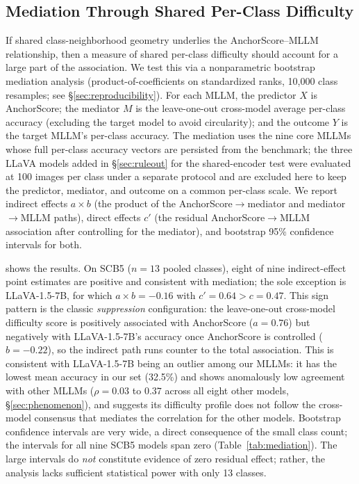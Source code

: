 \documentclass[a4paper,fleqn]{cas-sc}
\begin{document}
\subsection{Mediation Through Shared Per-Class Difficulty}
\label{sec:mediation}

If shared class-neighborhood geometry underlies the AnchorScore--MLLM relationship, then a measure of shared per-class difficulty should account for a large part of the association. We test this via a nonparametric bootstrap mediation analysis (product-of-coefficients on standardized ranks, 10{,}000 class resamples; see \S\ref{sec:reproducibility}). For each MLLM, the predictor $X$ is AnchorScore; the mediator $M$ is the leave-one-out cross-model average per-class accuracy (excluding the target model to avoid circularity); and the outcome $Y$ is the target MLLM's per-class accuracy. The mediation uses the nine core MLLMs whose full per-class accuracy vectors are persisted from the benchmark; the three LLaVA models added in \S\ref{sec:ruleout} for the shared-encoder test were evaluated at 100 images per class under a separate protocol and are excluded here to keep the predictor, mediator, and outcome on a common per-class scale. We report indirect effects $a\times b$ (the product of the AnchorScore$\rightarrow$mediator and mediator$\rightarrow$MLLM paths), direct effects $c'$ (the residual AnchorScore$\rightarrow$MLLM association after controlling for the mediator), and bootstrap 95\% confidence intervals for both.

 shows the results. On SCB5 ($n=13$ pooled classes), eight of nine indirect-effect point estimates are positive and consistent with mediation; the sole exception is LLaVA-1.5-7B, for which $a\times b=-0.16$ with $c'=0.64 > c=0.47$. This sign pattern is the classic \emph{suppression} configuration: the leave-one-out cross-model difficulty score is positively associated with AnchorScore ($a=0.76$) but negatively with LLaVA-1.5-7B's accuracy once AnchorScore is controlled ($b=-0.22$), so the indirect path runs counter to the total association. This is consistent with LLaVA-1.5-7B being an outlier among our MLLMs: it has the lowest mean accuracy in our set (32.5\%) and shows anomalously low agreement with other MLLMs ($\rho=0.03$ to $0.37$ across all eight other models, \S\ref{sec:phenomenon}), and suggests its difficulty profile does not follow the cross-model consensus that mediates the correlation for the other models. Bootstrap confidence intervals are very wide, a direct consequence of the small class count; the intervals for all nine SCB5 models span zero (Table~\ref{tab:mediation}). The large intervals do \emph{not} constitute evidence of zero residual effect; rather, the analysis lacks sufficient statistical power with only 13 classes.
\end{document}
